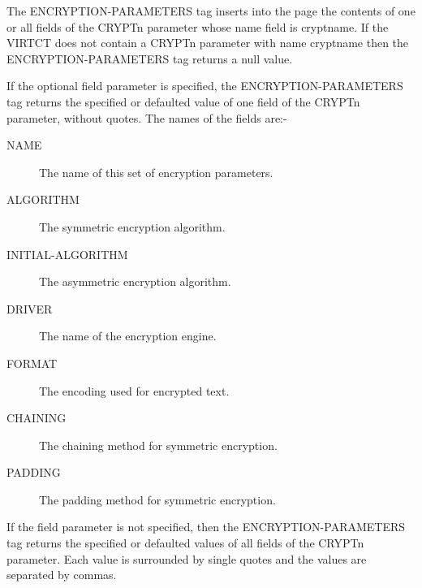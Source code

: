 \documentclass[letterpaper,10pt,english]{sphinxmanual}
\begin{document}

\begin{sphinxVerbatim}[commandchars=\\\{\}]
 
  
\end{sphinxVerbatim}

The ENCRYPTION-PARAMETERS tag inserts into the page the contents of one or all fields of the CRYPTn parameter whose name field is cryptname. If the VIRTCT does not contain a CRYPTn parameter with name cryptname then the ENCRYPTION-PARAMETERS tag returns a null value.

If the optional field parameter is specified, the ENCRYPTION-PARAMETERS tag returns the specified or defaulted value of one field of the CRYPTn parameter, without quotes. The names of the fields are:-
\begin{description}
\item[{NAME}] \leavevmode
The name of this set of encryption parameters.

\item[{ALGORITHM}] \leavevmode
The symmetric encryption algorithm.

\item[{INITIAL-ALGORITHM}] \leavevmode
The asymmetric encryption algorithm.

\item[{DRIVER}] \leavevmode
The name of the encryption engine.

\item[{FORMAT}] \leavevmode
The encoding used for encrypted text.

\item[{CHAINING}] \leavevmode
The chaining method for symmetric encryption.

\item[{PADDING}] \leavevmode
The padding method for symmetric encryption.

\end{description}

If the field parameter is not specified, then the ENCRYPTION-PARAMETERS tag returns the specified or defaulted values of all fields of the CRYPTn parameter. Each value is surrounded by single quotes and the values are separated by commas.
\end{document}
